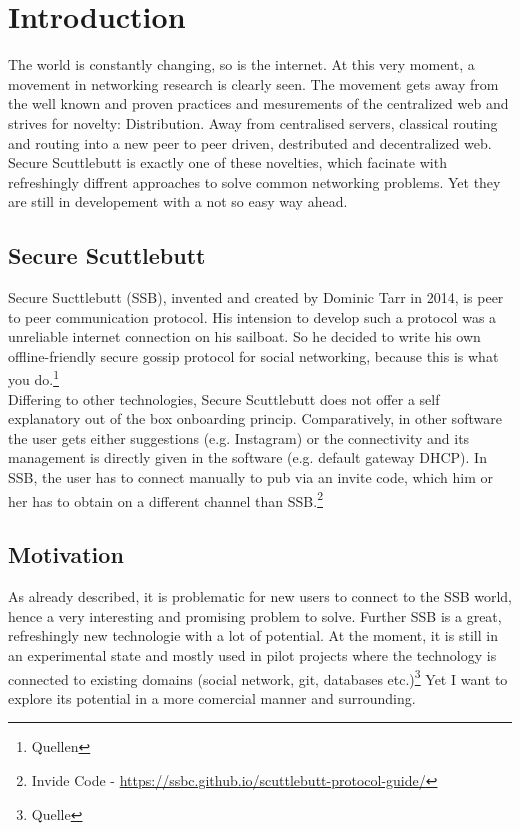 \chapter{Introduction}
The world is constantly changing, so is the internet. At this very moment, a movement in networking research is clearly seen. The movement gets away from the well known and proven practices and mesurements of the centralized web and strives for novelty: Distribution. Away from centralised servers, classical routing and routing into a new peer to peer driven, destributed and decentralized web. Secure Scuttlebutt is exactly one of these novelties, which facinate with refreshingly diffrent approaches to solve common networking problems. Yet they are still in developement with a not so easy way ahead.
\section{Secure Scuttlebutt}
Secure Sucttlebutt (SSB), invented and created by Dominic Tarr in 2014, is peer to peer communication protocol. His intension to develop such a protocol was a unreliable internet connection on his sailboat. So he decided to write his own offline-friendly secure gossip protocol for social networking, because this is what you do.\footnote{Quellen}\\

Differing to other technologies, Secure Scuttlebutt does not offer a self explanatory out of the box onboarding princip. Comparatively, in other software the user gets either suggestions (e.g. Instagram) or the connectivity and its management is directly given in the software (e.g. default gateway DHCP). In SSB, the user has to connect manually to pub via an invite code, which him or her has to obtain on a different channel than SSB.\footnote{Invide Code - \url{https://ssbc.github.io/scuttlebutt-protocol-guide/}} 

\section{Motivation}
As already described, it is problematic for new users to connect to the SSB world, hence a very interesting and promising problem to solve. Further SSB is a great, refreshingly new technologie with a lot of potential. At the moment, it is still in an experimental state and mostly used in pilot projects where the technology is connected to existing domains (social network, git, databases etc.)\footnote{Quelle} Yet I want to explore its potential in a more comercial manner and surrounding.
